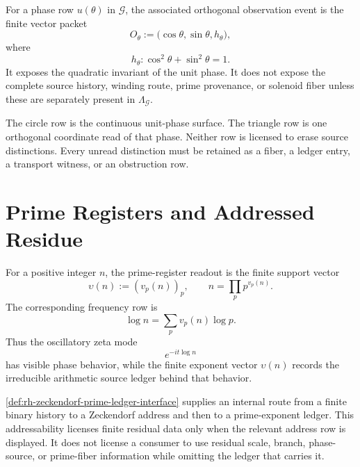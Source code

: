 \begin{definition}
\label{def:rh-circle-triangle-orthogonal-observation-event}
For a phase row $u(\theta)$ in $\mathcal G$, the associated orthogonal
observation event is the finite vector packet
$$
O_{\theta}
:=
\bigl(\cos\theta,\sin\theta,h_{\theta}\bigr),
$$
where
$$
h_{\theta}:\cos^2\theta+\sin^2\theta=1.
$$
It exposes the quadratic invariant of the unit phase. It does not expose
the complete source history, winding route, prime provenance, or solenoid
fiber unless these are separately present in $\Lambda_{\mathcal G}$.
\end{definition}

\begin{principle}
\label{prin:rh-circle-triangle-readout-surfaces}
The circle row is the continuous unit-phase surface. The triangle row is
one orthogonal coordinate read of that phase. Neither row is licensed to
erase source distinctions. Every unread distinction must be retained as a
fiber, a ledger entry, a transport witness, or an obstruction row.
\end{principle}

\section{Prime Registers and Addressed Residue}
\label{sec:rh-circle-triangle-prime-register}

\begin{definition}
\label{def:rh-zeta-prime-register-readout}
For a positive integer $n$, the prime-register readout is the finite
support vector
$$
\upsilon(n):=(v_p(n))_p,
\qquad
n=\prod_p p^{v_p(n)}.
$$
The corresponding frequency row is
$$
\log n
=
\sum_p v_p(n)\log p.
$$
Thus the oscillatory zeta mode
$$
e^{-it\log n}
$$
has visible phase behavior, while the finite exponent vector
$\upsilon(n)$ records the irreducible arithmetic source ledger behind
that behavior.
\end{definition}

\begin{principle}
\label{prin:rh-finite-addressability-not-free-hiding}
\autoref{def:rh-zeckendorf-prime-ledger-interface} supplies an internal
route from a finite binary history to a Zeckendorf address and then to a
prime-exponent ledger. This addressability licenses finite residual data
only when the relevant address row is displayed. It does not license a
consumer to use residual scale, branch, phase-source, or prime-fiber
information while omitting the ledger that carries it.
\end{principle}

